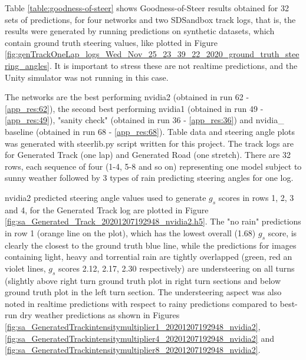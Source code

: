Table \ref{table:goodness-of-steer} shows Goodness-of-Steer results obtained for 32 sets of predictions, for four networks and two SDSandbox track logs, that is, the results were generated by running predictions on synthetic datasets, which contain ground truth steering values, like plotted in Figure \ref{fig:genTrackOneLap_logs_Wed_Nov_25_23_39_22_2020_ground_truth_steering_angles}. It is important to stress these are not realtime predictions, and the Unity simulator was not running in this case.

The networks are the best performing nvidia2 (obtained in run 62 - \ref{app_res:62}), the second best performing nvidia1 (obtained in run 49 - \ref{app_res:49}), "sanity check" (obtained in run 36 - \ref{app_res:36}) and nvidia\_ baseline (obtained in run 68 - \ref{app_res:68}). Table data and steering angle plots was generated with steerlib.py script written for this project. The track logs are for Generated Track (one lap) and Generated Road (one stretch). There are 32 rows, each sequence of four (1-4, 5-8 and so on) representing one model subject to sunny weather followed by 3 types of rain predicting steering angles for one log. 

nvidia2 predicted steering angle values used to generate $g_s$ scores in rows 1, 2, 3 and 4, for the Generated Track log are plotted in Figure  \ref{fig:sa_Generated_Track_20201207192948_nvidia2.h5}. The "no rain" predictions in row 1 (orange line on the plot), which has the lowest overall (1.68) $g_s$ score, is clearly the closest to the ground truth blue line, while the predictions for images containing light, heavy and torrential rain are tightly overlapped (green, red an violet lines, $g_s$ scores 2.12, 2.17, 2.30 respectively) are understeering on all turns (slightly above right turn ground truth plot in right turn sections and below ground truth plot in the left turn section. The understeering aspect was also noted in realtime predictions with respect to rainy predictions compared to best-run dry weather predictions as shown in Figures \ref{fig:sa_GeneratedTrackintensitymultiplier1_20201207192948_nvidia2}, 
\ref{fig:sa_GeneratedTrackintensitymultiplier4_20201207192948_nvidia2} and 
\ref{fig:sa_GeneratedTrackintensitymultiplier8_20201207192948_nvidia2}.




